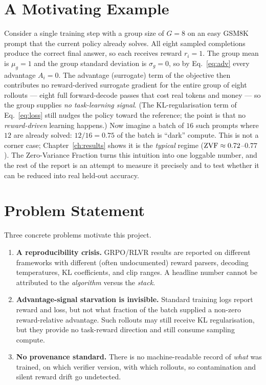 \section{A Motivating Example}
Consider a single training step with a group size of $G=8$ on an easy GSM8K prompt
that the current policy already solves. All eight sampled completions produce the
correct final answer, so each receives reward $r_i=1$. The group mean is $\mu_g=1$
and the group standard deviation is $\sigma_g=0$, so by Eq.~\eqref{eq:adv} every
advantage $A_i=0$. The advantage (surrogate) term of the objective then contributes
no reward-derived surrogate gradient for the entire group of eight rollouts --- eight full forward-decode
passes that cost real tokens and money --- so the group supplies \emph{no
task-learning signal}. (The KL-regularisation term of Eq.~\eqref{eq:loss} still nudges
the policy toward the reference; the point is that no \emph{reward-driven} learning
happens.)
Now imagine a batch of $16$ such prompts where $12$ are already solved: $12/16=0.75$
of the batch is ``dark'' compute. This is not a corner case; Chapter~\ref{ch:results}
shows it is the \emph{typical} regime ($\mathrm{ZVF}\approx0.72$--$0.77$). The Zero-Variance
Fraction turns this intuition into one loggable number, and the rest of the report is
an attempt to measure it precisely and to test whether it can be reduced into real
held-out accuracy.

\section{Problem Statement}
Three concrete problems motivate this project.
\begin{enumerate}[leftmargin=1.6em,itemsep=3pt]
  \item \textbf{A reproducibility crisis.} GRPO/RLVR results are reported on
  different frameworks with different (often undocumented) reward parsers, decoding
  temperatures, KL coefficients, and clip ranges. A headline number cannot be
  attributed to the \emph{algorithm} versus the \emph{stack}.
  \item \textbf{Advantage-signal starvation is invisible.} Standard training logs
  report reward and loss, but not what fraction of the batch supplied a non-zero
  reward-relative advantage. Such rollouts may still receive KL regularisation, but
  they provide no task-reward direction and still consume sampling compute.
  \item \textbf{No provenance standard.} There is no machine-readable record of
  \emph{what} was trained, on which verifier version, with which rollouts, so
  contamination and silent reward drift go undetected.
\end{enumerate}

